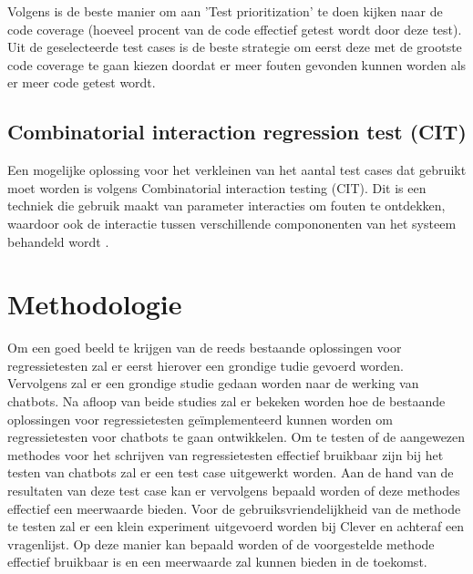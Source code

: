 Volgens \textcite{PrashantMalangave2015} is de beste manier om aan 'Test prioritization' te doen kijken naar de code coverage (hoeveel procent van de code effectief getest wordt door deze test). Uit de geselecteerde test cases is de beste strategie om eerst deze met de grootste code coverage te gaan kiezen doordat er meer fouten gevonden kunnen worden als er meer code getest wordt.

\subsection{Combinatorial interaction regression test (CIT)}

Een mogelijke oplossing voor het verkleinen van het aantal test cases dat gebruikt moet worden is volgens \textcite{Qu2014} Combinatorial interaction testing (CIT). Dit is een techniek die gebruik maakt van parameter interacties om fouten te ontdekken, waardoor ook de interactie tussen verschillende compononenten van het systeem behandeld wordt \autocite{Brcic2013}.


\section{Methodologie}
\label{sec:methodologie}

Om een goed beeld te krijgen van de reeds bestaande oplossingen voor regressietesten zal er eerst hierover een grondige tudie gevoerd worden. Vervolgens zal er een grondige studie gedaan worden naar de werking van chatbots. Na afloop van beide studies zal er bekeken worden hoe de bestaande oplossingen voor regressietesten geïmplementeerd kunnen worden om regressietesten voor chatbots te gaan ontwikkelen. Om te testen of de aangewezen methodes voor het schrijven van regressietesten effectief bruikbaar zijn bij het testen van chatbots zal er een test case uitgewerkt worden. Aan de hand van de resultaten van deze test case kan er vervolgens bepaald worden of deze methodes effectief een meerwaarde bieden. Voor de gebruiksvriendelijkheid van de methode te testen zal er een klein experiment uitgevoerd worden bij Clever en achteraf een vragenlijst. Op deze manier kan bepaald worden of de voorgestelde methode effectief bruikbaar is en een meerwaarde zal kunnen bieden in de toekomst. 


